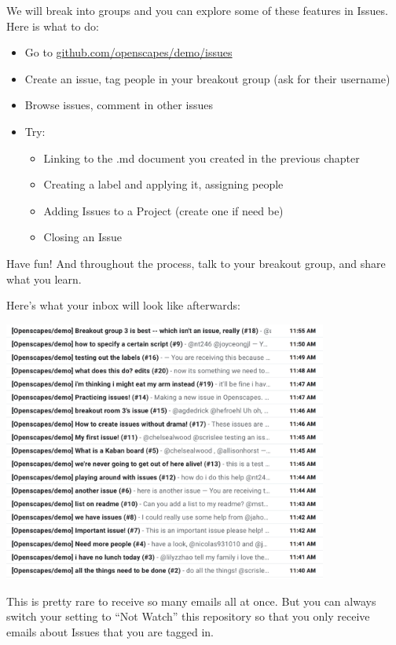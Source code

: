 \documentclass[
  letterpaper,
  DIV=11,
  numbers=noendperiod]{scrreprt}
\providecommand{\tightlist}{%
  \setlength{\itemsep}{0pt}\setlength{\parskip}{0pt}}
\begin{document}
We will break into groups and you can explore some of these features in
Issues. Here is what to do:

\begin{itemize}
\tightlist
\item
  Go to
  \href{https://github.com/openscapes/demo/issues}{github.com/openscapes/demo/issues}
\item
  Create an issue, tag people in your breakout group (ask for their
  username)
\item
  Browse issues, comment in other issues
\item
  Try:

  \begin{itemize}
  \tightlist
  \item
    Linking to the .md document you created in the previous chapter
  \item
    Creating a label and applying it, assigning people
  \item
    Adding Issues to a Project (create one if need be)
  \item
    Closing an Issue
  \end{itemize}
\end{itemize}

Have fun! And throughout the process, talk to your breakout group, and
share what you learn.

Here's what your inbox will look like afterwards:

\includegraphics[width=0.8\textwidth,height=\textheight]{./img/issues-inbox-crop.png}

This is pretty rare to receive so many emails all at once. But you can
always switch your setting to ``Not Watch'' this repository so that you
only receive emails about Issues that you are tagged in.
\end{document}
